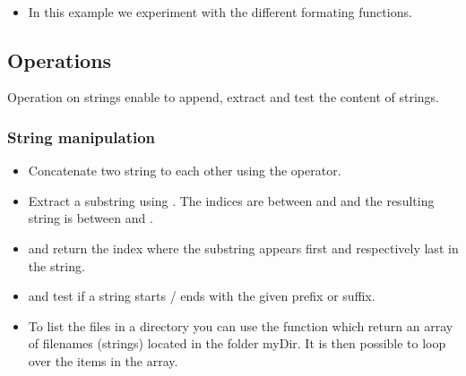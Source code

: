 \begin{frame}[fragile]
  \begin{example}~\par
    \begin{itemize}
    \item In this example we experiment with the different formating
      functions.~\par
      
    \end{itemize}
  \end{example}
\end{frame}

\subsection{Operations}

Operation on strings enable to append, extract and test the content of strings.

\begin{frame}
  \frametitle<presentation>{String manipulation}
  \begin{itemize}
    \item Concatenate two string to each other using the \code{+} operator.
    \item Extract a substring using . The indices are between  and
       and the resulting string is between
       and .
    \item {} and
       return the index where the
      substring appears first and respectively last in the string.
    \item {} and  test if a string starts / ends with the given prefix or
      suffix.
    \item To list the files in a directory you can use the function
       which return an array of
      filenames (strings) located in the folder myDir. It is then
      possible to loop over the items in the array.
  \end{itemize}
\end{frame}


